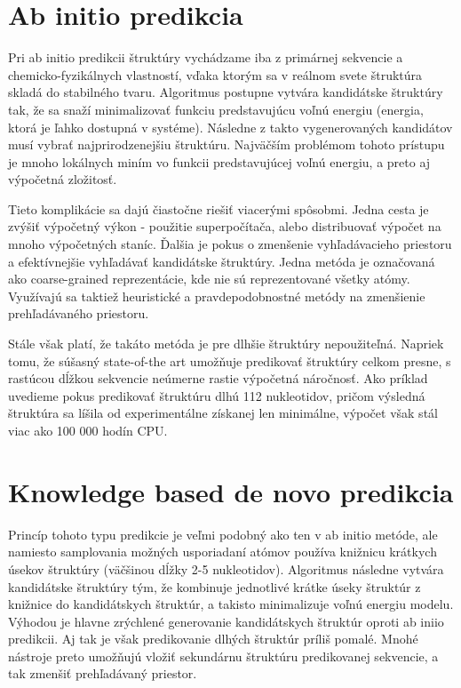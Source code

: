 \section{Ab initio predikcia}
Pri ab initio predikcii štruktúry vychádzame iba z primárnej sekvencie a chemicko-fyzikálnych vlastností, vďaka ktorým sa v reálnom svete štruktúra skladá do stabilného tvaru. Algoritmus postupne vytvára kandidátske štruktúry tak, že sa snaží minimalizovať funkciu predstavujúcu voľnú energiu (energia, ktorá je ľahko dostupná v systéme). Následne z takto vygenerovaných kandidátov musí vybrať najprirodzenejšiu štruktúru. Najväčším problémom tohoto prístupu je mnoho lokálnych miním vo funkcii predstavujúcej voľnú energiu, a preto aj výpočetná zložitosť.


\indent  Tieto komplikácie sa dajú čiastočne riešiť viacerými spôsobmi. Jedna cesta je zvýšiť výpočetný výkon - použitie superpočítača, alebo distribuovať výpočet na mnoho výpočetných staníc. Ďalšia je pokus o zmenšenie vyhľadávacieho priestoru a efektívnejšie vyhľadávať kandidátske štruktúry. Jedna metóda je označovaná ako coarse-grained reprezentácie, kde nie sú reprezentované všetky atómy. Využívajú sa taktiež heuristické a pravdepodobnostné metódy na zmenšienie prehľadávaného priestoru.


\indent  Stále však platí, že takáto metóda je pre dlhšie štruktúry nepoužiteľná. Napriek tomu, že súšasný state-of-the art umožňuje predikovať štruktúry celkom presne, s rastúcou dĺžkou sekvencie neúmerne rastie výpočetná náročnosť. Ako príklad uvedieme pokus predikovať štruktúru dlhú 112 nukleotidov, pričom výsledná štruktúra sa líšila od experimentálne získanej len minimálne, výpočet však stál viac ako 100 000 hodín CPU.  \cite{Qian2007}


\section{Knowledge based de novo predikcia}
Princíp tohoto typu predikcie je veľmi podobný ako ten v ab initio metóde, ale namiesto samplovania možných usporiadaní atómov používa knižnicu krátkych úsekov štruktúry (väčšinou dĺžky 2-5 nukleotidov). Algoritmus následne vytvára kandidátske štruktúry tým, že kombinuje jednotlivé krátke úseky štruktúr z knižnice do kandidátskych štruktúr, a takisto minimalizuje voľnú energiu modelu. Výhodou je hlavne zrýchlené generovanie kandidátskych štruktúr oproti ab iniio predikcii. Aj tak je však predikovanie dlhých štruktúr príliš pomalé. Mnohé nástroje preto umožňujú vložiť sekundárnu štruktúru predikovanej sekvencie, a tak zmenšiť prehľadávaný priestor. 

